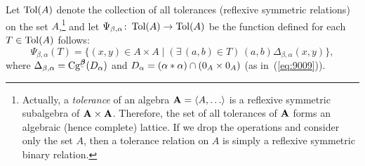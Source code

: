 Let $\operatorname{Tol}(A)$ denote the collection of all tolerances (reflexive symmetric relations)
on the set $A$,\footnote{Actually, a
  \emph{tolerance} of an algebra $\bA = \<A, \dots\>$
  is a reflexive symmetric subalgebra of $\mathbf{A} \times \mathbf{A}$.
  Therefore, the set of all tolerances of $\mathbf{A}$ forms an
  algebraic (hence complete) lattice.
  If we drop the operations and consider only the set $A$, then a tolerance relation on $A$
  is simply a reflexive symmetric binary relation.
}
and let
$\Psi_{\beta, \alpha} \colon \operatorname{Tol}(A) \to \operatorname{Tol}(A)$ be the function defined
for each $T \in  \operatorname{Tol}(A)$ follows:
\begin{equation}
  \label{eq:7}
  \Psi_{\beta, \alpha}(T)
  = \{ (x,y) \in A\times A \mid
  (\exists\, (a,b) \in T)\,
 (a,b) \mathrel{\Delta_{\beta, \alpha}} (x,y)\},
\end{equation}
where
$\Delta_{\beta, \alpha} = \Cg^{\bbeta}(D_\alpha)$ and
$D_\alpha =(\alpha \ast \alpha) \cap (0_A \times 0_A)$
(as in~(\ref{eq:9009})).

